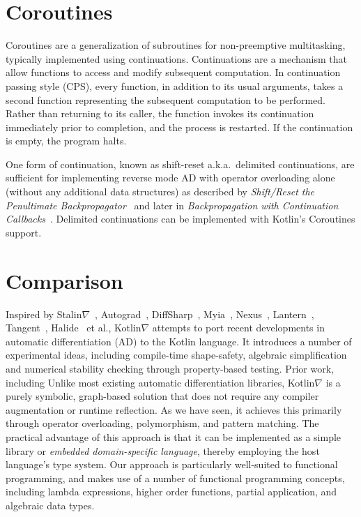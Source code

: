 \documentclass[12pt,initial,twoside,maitrise]{dms}
\numberwithin{equation}{section}
\numberwithin{table}{chapter}
\numberwithin{figure}{chapter}
\begin{document}
\section{Coroutines}\label{sec:coroutines}

Coroutines are a generalization of subroutines for non-preemptive multitasking, typically implemented using continuations. Continuations are a mechanism that allow functions to access and modify subsequent computation. In continuation passing style (CPS), every function, in addition to its usual arguments, takes a second function representing the subsequent computation to be performed. Rather than returning to its caller, the function invokes its continuation immediately prior to completion, and the process is restarted. If the continuation is empty, the program halts.

One form of continuation, known as shift-reset a.k.a.\ delimited continuations, are sufficient for implementing reverse mode AD with operator overloading alone (without any additional data structures) as described by \textit{Shift/Reset the Penultimate Backpropagator}~\citep{wang2018demystifying} and later in \textit{Backpropagation with Continuation Callbacks}~\citep{wang2018backpropagation}. Delimited continuations can be implemented with Kotlin's Coroutines support.

\section{Comparison}\label{sec:comparison}

Inspired by Stalin$\nabla$~\citep{pearlmutter2008using}, Autograd~\citep{maclaurin2015autograd}, DiffSharp~\citep{baydin-diffsharp}, Myia~\citep{breuleux2017automatic}, Nexus~\citep{chen2017typesafe}, Lantern~\citep{wang2018demystifying}, Tangent~\citep{van2018tangent}, Halide~\citep{li2018halide} et al., Kotlin$\nabla$ attempts to port recent developments in automatic differentiation (AD) to the Kotlin language. It introduces a number of experimental ideas, including compile-time shape-safety, algebraic simplification and numerical stability checking through property-based testing. Prior work, including Unlike most existing automatic differentiation libraries, Kotlin$\nabla$ is a purely symbolic, graph-based solution that does not require any compiler augmentation or runtime reflection. As we have seen, it achieves this primarily through operator overloading, polymorphism, and pattern matching. The practical advantage of this approach is that it can be implemented as a simple library or \textit{embedded domain-specific language}, thereby employing the host language's type system. Our approach is particularly well-suited to functional programming, and makes use of a number of functional programming concepts, including lambda expressions, higher order functions, partial application, and algebraic data types. \\
\end{document}
